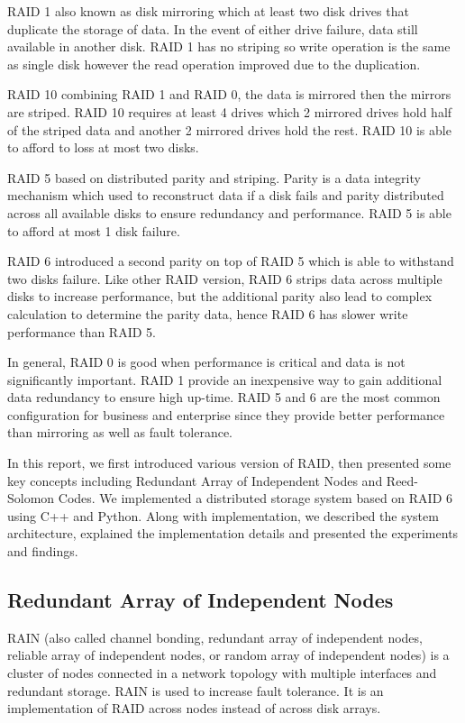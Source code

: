 \documentclass[conference]{IEEEtran}
\begin{document}
RAID 1 also known as disk mirroring which at least two disk drives that duplicate the storage of data. In the event of either drive failure, data still available in another disk. RAID 1 has no striping so write operation is the same as single disk however the read operation improved due to the duplication. 

RAID 10 combining RAID 1 and RAID 0, the data is mirrored then the mirrors are striped. RAID 10 requires at least 4 drives which 2 mirrored drives hold half of the striped data and another 2 mirrored drives hold the rest. RAID 10 is able to afford to loss at most two disks. 

RAID 5\cite{chen1994raid} based on distributed parity and striping. Parity is a data integrity mechanism which used to reconstruct data if a disk fails and parity distributed across all available disks to ensure redundancy and performance. RAID 5 is able to afford at most 1 disk failure. 

RAID 6\cite{anvin2007mathematics} introduced a second parity on top of RAID 5 which is able to withstand two disks failure. Like other RAID version, RAID 6 strips data across multiple disks to increase performance, but the additional parity also lead to complex calculation to determine the parity data, hence RAID 6 has slower write performance than RAID 5.

In general, RAID 0 is good when performance is critical and data is not significantly important. RAID 1 provide an inexpensive way to gain additional data redundancy to ensure high up-time. RAID 5 and 6 are the most common configuration for business and enterprise since they provide better performance than mirroring as well as fault tolerance.

In this report, we first introduced various version of RAID, then presented some key concepts including Redundant Array of Independent Nodes and Reed-Solomon Codes. We implemented a distributed storage system based on RAID 6 using C++ and Python. Along with implementation, we described the system architecture, explained the implementation details and presented the experiments and findings. 

\subsection{Redundant Array of Independent Nodes}
RAIN\cite{rodriguez2006policy} (also called channel bonding, redundant array of independent nodes, reliable array of independent nodes, or random array of independent nodes) is a cluster of nodes connected in a network topology with multiple interfaces and redundant storage. RAIN is used to increase fault tolerance. It is an implementation of RAID across nodes instead of across disk arrays.
\end{document}
